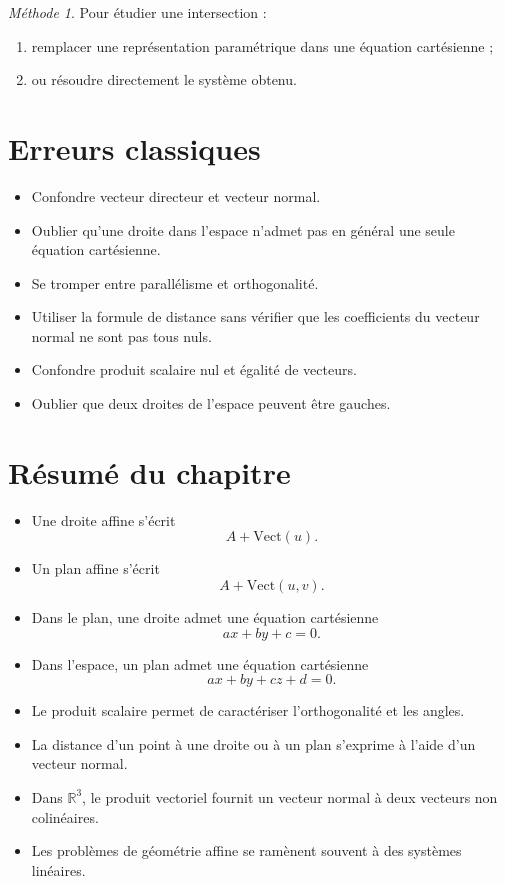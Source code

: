 \documentclass[11pt,a4paper]{article}
\theoremstyle{remark}
\newtheorem*{methode}{Méthode}
\newcommand{\R}{\mathbb{R}}
\newcommand{\Vect}{\mathrm{Vect}}
\begin{document}
\begin{methode}
Pour étudier une intersection :
\begin{enumerate}
    \item remplacer une représentation paramétrique dans une équation cartésienne ;
    \item ou résoudre directement le système obtenu.
\end{enumerate}
\end{methode}

\section{Erreurs classiques}

\begin{itemize}
    \item Confondre vecteur directeur et vecteur normal.
    \item Oublier qu’une droite dans l’espace n’admet pas en général une seule équation cartésienne.
    \item Se tromper entre parallélisme et orthogonalité.
    \item Utiliser la formule de distance sans vérifier que les coefficients du vecteur normal ne sont pas tous nuls.
    \item Confondre produit scalaire nul et égalité de vecteurs.
    \item Oublier que deux droites de l’espace peuvent être gauches.
\end{itemize}

\section{Résumé du chapitre}

\begin{itemize}
    \item Une droite affine s’écrit
    \[
    A+\Vect(u).
    \]
    \item Un plan affine s’écrit
    \[
    A+\Vect(u,v).
    \]
    \item Dans le plan, une droite admet une équation cartésienne
    \[
    ax+by+c=0.
    \]
    \item Dans l’espace, un plan admet une équation cartésienne
    \[
    ax+by+cz+d=0.
    \]
    \item Le produit scalaire permet de caractériser l’orthogonalité et les angles.
    \item La distance d’un point à une droite ou à un plan s’exprime à l’aide d’un vecteur normal.
    \item Dans \(\R^3\), le produit vectoriel fournit un vecteur normal à deux vecteurs non colinéaires.
    \item Les problèmes de géométrie affine se ramènent souvent à des systèmes linéaires.
\end{itemize}
\end{document}
